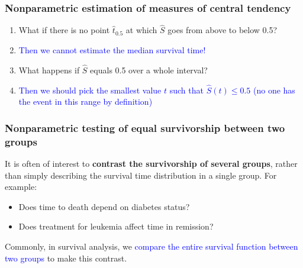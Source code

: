 \documentclass[12pt, 
hyperref={colorlinks=true, linkcolor=blue, urlcolor=cyan},dvipsnames]{beamer}
\begin{document}
\begin{frame}
\frametitle{Nonparametric estimation of measures of central tendency}
\begin{enumerate}
\item What if there is no point $\hat{t}_{0.5}$ at which $\widehat{S}$ goes from above to below 0.5?
\item[] \textcolor{blue}{Then we cannot estimate the median survival time!}
\item What happens if $\widehat{S}$ equals 0.5 over a whole interval?
\item[] \textcolor{blue}{Then we should pick the smallest value $t$ such that $\widehat{S}(t) \leq 0.5$ (no one has the event in this range by definition)}
\end{enumerate}

\end{frame}

\begin{frame}
\frametitle{Nonparametric testing of equal survivorship between two groups}

It is often of interest to \textbf{contrast the survivorship of several groups}, rather than simply describing the survival time distribution in a single group. For example:
\begin{itemize}
\item Does time to death depend on diabetes status?
\item Does treatment for leukemia affect time in remission?
\end{itemize}

Commonly, in survival analysis, we \textcolor{blue}{compare the entire survival function between two groups} to make this contrast.
\end{frame}
\end{document}
